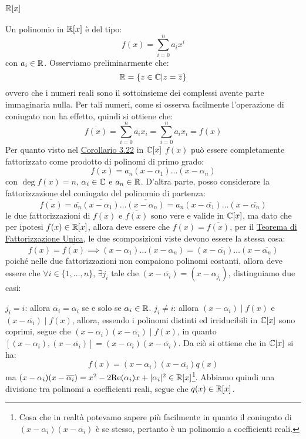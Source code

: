 \documentclass[11pt]{scrartcl}
\begin{document}
\subsubsection{$\mathbb R[x]$}
Un polinomio in $\mathbb R[x]$ è del tipo:
	\[ f(x) = \sum_{i=0}^{n} a_ix^i
	\]
con $a_i \in \mathbb R$. Osserviamo preliminarmente che:
	\[ \mathbb R = \{z \in \mathbb C | z = \overline z\}
	\]
ovvero che i numeri reali sono il sottoinsieme dei complessi avente parte immaginaria nulla. Per tali numeri, come si osserva facilmente l'operazione di coniugato non ha effetto, quindi si ottiene che:
	\[ \overline{f(x)} = \sum_{i=0}^{n} \overline{a_i}x_i = \sum_{i=0}^{n} a_ix_i = f(x)
	\]
Per quanto visto nel \hyperref[p:3.22]{Corollario 3.22} in $\mathbb C[x]$ $f(x)$ può essere completamente fattorizzato come prodotto di polinomi di primo grado:
	\[ f(x) = a_n (x - \alpha_1) \ldots  (x - \alpha_n)
	\]
con $\deg f(x) = n$, $\alpha_i \in \mathbb C$ e $a_n \in \mathbb R$. D'altra parte, posso considerare la fattorizzazione del coniugato del polinomio di partenza:
	\[ \overline{f(x)} = \overline{a_n}\overline{ (x - \alpha_1)} \ldots  \overline{(x - \alpha_n)} = a_n (x - \overline{\alpha_1}) \ldots  (x - \overline{\alpha_n})
	\]
le due fattorizzazioni di $f(x)$ e $\overline{f(x)}$ sono vere e valide in $\mathbb C[x]$, ma dato che per ipotesi $f(x) \in \mathbb R[x]$, allora deve essere che $f(x) = \overline{f(x)}$, per il \hyperref[p:fac]{Teorema di Fattorizzazione Unica}, le due scomposizioni viste devono essere la stessa cosa:
	\[ f(x) = \overline{f(x)} \implies (x - \alpha_1) \ldots  (x - \alpha_n) = (x - \overline{\alpha_1}) \ldots  (x - \overline{\alpha_n})
	\]
poiché nelle due fattorizzazioni non compaiono polinomi costanti, allora deve essere che $\forall i \in \{1,\ldots,n\}$, $\exists j_i$ tale che $(x - \overline{\alpha_i}) = (x - \alpha_{j_i})$, distinguiamo due casi:
	\begin{itemize}
	\ii \underline{$j_i = i$}: allora $\overline{\alpha_i} = \alpha_i$ se e solo se $\alpha_i \in \mathbb R$.
	\ii \underline{$j_i \ne i$}: allora $(x - \alpha_i) \mid f(x)$ e $(x - \overline{\alpha_i}) \mid f(x)$, allora, essendo i polinomi distinti ed irriducibili in $\mathbb C[x]$ sono coprimi, segue che $(x - \alpha_i)(x - \overline{\alpha_i}) \mid f(x)$, in quanto $[(x - \alpha_i),(x - \overline{\alpha_i})] = (x - \alpha_i)(x - \overline{\alpha_i})$. Da ciò si ottiene che in $\mathbb C[x]$ si ha:
		\[ f(x) =  (x - \alpha_i)(x - \overline{\alpha_i}) q(x)
		\]
ma $ (x - \alpha_i)(x - \overline{\alpha_i}) = x^2 - 2\text{Re}(\alpha_i)x + |\alpha_i|^2 \in \mathbb R[x]$\footnote{Cosa che in realtà potevamo sapere più facilmente in quanto il coniugato di $(x - \alpha_i)(x - \overline{\alpha_i})$ è se stesso, pertanto è un polinomio a coefficienti reali.}. Abbiamo quindi una divisione tra polinomi a coefficienti reali, segue che $q(x) \in \mathbb R[x]$.
	\end{itemize}
\end{document}
